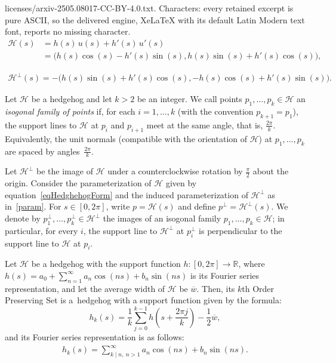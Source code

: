 \documentclass[10pt,a4paper]{amsart}
\begin{document}
licenses/arxiv-2505.08017-CC-BY-4.0.txt. Characters: every retained excerpt is pure ASCII, so the delivered engine, XeLaTeX with its default Latin Modern text font, reports no missing character.
\begin{align}
\label{eqHedghehogForm}\mathcal{H}(s) &= h(s)\, u(s) + h'(s)\, u'(s)\\ 
\nonumber&=\Big( h(s) \cos(s) - h'(s) \sin(s),  h(s) \sin(s) + h'(s) \cos(s) \Big),
\end{align}

\begin{align}
    \label{param}\mathcal{H}^\perp(s) = -\Big( h(s) \sin(s) + h'(s) \cos(s),  -h(s) \cos(s) + h'(s) \sin(s) \Big).
\end{align}

\begin{defn}\label{k-tuple pair}
Let $\mathcal{H}$ be a hedgehog and let $k>2$ be an integer. We call points
$p_1,\ldots,p_k\in\mathcal{H}$ an \textit{isogonal family of points} if, for each
$i=1,\ldots,k$ (with the convention $p_{k+1}=p_1$), the support lines to
$\mathcal{H}$ at $p_i$ and $p_{i+1}$ meet at the same angle, that is, $\frac{2\pi}{k}$.
Equivalently, the unit normals (compatible with the orientation of $\mathcal{H}$) at $p_1,\ldots,p_k$ are spaced by angles~$\frac{2\pi}{k}$.

Let $\mathcal{H}^{\perp}$ be the image of $\mathcal{H}$ under a counterclockwise
rotation by $\frac{\pi}{2}$ about the origin. Consider the parameterization
of $\mathcal{H}$ given by equation~\eqref{eqHedghehogForm} and the induced
parameterization of $\mathcal{H}^{\perp}$ as in~\eqref{param}. For $s\in[0,2\pi]$,
write $p=\mathcal{H}(s)$ and define $p^{\perp}=\mathcal{H}^{\perp}(s)$. We denote by
$p_1^{\perp},\ldots,p_k^{\perp}\in\mathcal{H}^{\perp}$ the images of an isogonal family
$p_1,\ldots,p_k\in\mathcal{H}$; in particular, for every $i$, the support line to
$\mathcal{H}^{\perp}$ at $p_i^{\perp}$ is perpendicular to the support line to
$\mathcal{H}$ at $p_i$.
\end{defn}

\begin{prop}\label{Preservingsuppth}
Let $\mathcal{H}$ be a hedgehog with the support function $h: [0,2\pi] \to \mathbb{R}$, where $h(s)=a_0+\sum_{n=1}^{\infty}a_n\cos (ns)+b_n\sin (ns)$ is its Fourier series representation, and let the average width of $\mathcal{H}$ be $\overline{w}$. Then, its $k$th Order Preserving Set is a~hedgehog with a support function given by the formula:
$$ h_k(s) = \frac{1}{k}\sum_{j=0}^{k-1}h\left(s+\frac{2\pi j}{k}\right) - \frac{1}{2}\overline{w},$$
and its Fourier series representation is as follows:
\begin{align}
    \label{eqFourierkOPS}h_k(s) = \sum_{k \mid n,\ n > 1}^\infty a_n\cos(ns) + b_n\sin(ns).
\end{align}
\end{prop}
\end{document}
